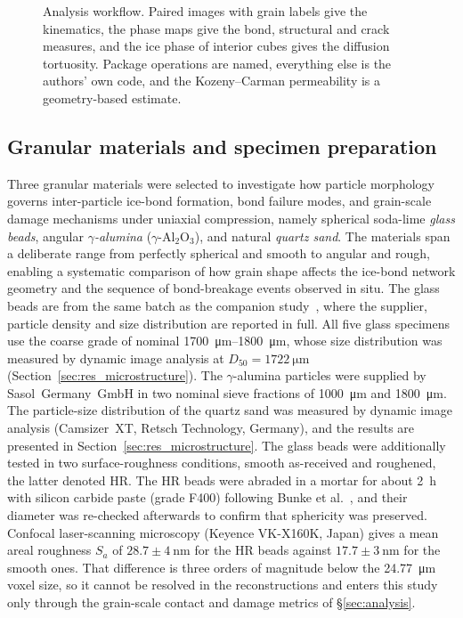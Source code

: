 \documentclass[preprint,12pt,numbers]{elsarticle}
\begin{document}
  \begin{figure}[htbp]
    \centering
    \resizebox{!}{0.88\textheight}{}
    \caption{Analysis workflow.  Paired images with grain labels give the
      kinematics, the phase maps give the bond, structural and crack
      measures, and the ice phase of interior cubes gives the diffusion
      tortuosity.  Package operations are named, everything else is the
      authors' own code, and the Kozeny--Carman permeability is a
      geometry-based estimate.}
    \label{fig:pipeline}
  \end{figure}

  \subsection{Granular materials and specimen preparation}
  \label{sec:materials}
  Three granular materials were selected to investigate how particle morphology
  governs inter-particle ice-bond formation, bond failure modes, and grain-scale
  damage mechanisms under uniaxial compression, namely spherical soda-lime
  \emph{glass beads}, angular \emph{$\gamma$-alumina}
  ($\gamma$-Al$_2$O$_3$), and natural \emph{quartz sand}.
  The materials span a deliberate range from perfectly spherical and smooth to
  angular and rough, enabling a systematic comparison of how grain shape
  affects the ice-bond network geometry and the sequence of bond-breakage
  events observed in situ.
  The glass beads are from the same batch as the companion
  study~\cite{Khosrozadeh2026inverse}, where the supplier, particle density and
  size distribution are reported in full.  All five glass specimens use the
  coarse grade of nominal \SIrange{1700}{1800}{\micro\meter}, whose size
  distribution was measured by dynamic image analysis at
  $D_{50}=\SI{1722}{\micro\meter}$ (Section~\ref{sec:res_microstructure}).  The
  $\gamma$-alumina particles were supplied by Sasol~Germany~GmbH in two nominal
  sieve fractions of \SI{1000}{\micro\meter} and \SI{1800}{\micro\meter}.
  The particle-size distribution of the quartz sand was measured by dynamic
  image analysis (Camsizer~XT, Retsch Technology, Germany), and the results
  are presented in Section~\ref{sec:res_microstructure}.
  The glass beads were additionally tested in two surface-roughness
  conditions, smooth as-received and roughened, the latter denoted HR.  The HR
  beads were abraded in a mortar for about \SI{2}{\hour} with silicon carbide
  paste (grade F400) following Bunke et al.~\cite{BUNKE2024151016}, and their
  diameter was re-checked afterwards to confirm that sphericity was preserved.
  Confocal laser-scanning microscopy (Keyence VK-X160K, Japan) gives a mean
  areal roughness $S_a$ of $28.7 \pm \SI{4}{\nano\meter}$ for the HR beads
  against $17.7 \pm \SI{3}{\nano\meter}$ for the smooth ones.  That difference
  is three orders of magnitude below the \SI{24.77}{\micro\meter} voxel size,
  so it cannot be resolved in the reconstructions and enters this study only
  through the grain-scale contact and damage metrics of
  \S\ref{sec:analysis}.
\end{document}
